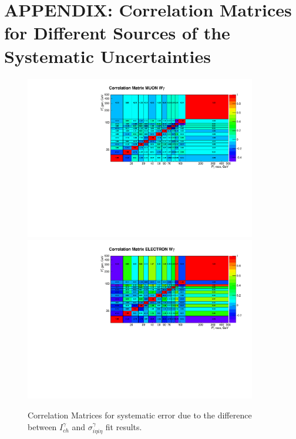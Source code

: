 \section{APPENDIX: Correlation Matrices for Different Sources of the Systematic Uncertainties}
\label{sec:corrMatrices}

\begin{figure}[htb]
  \begin{center}
   \includegraphics[width=0.90\textwidth]{../figs/figs_v11/MUON_WGamma/Constants/matrCorrelation_syst_CHISOvsSIHIH.pdf}\\
\includegraphics[width=0.90\textwidth]{../figs/figs_v11/ELECTRON_WGamma/Constants/matrCorrelation_syst_CHISOvsSIHIH.pdf}
  \caption{Correlation Matrices for systematic error due to the difference between $I_{ch}^{\gamma}$ and $\sigma_{i\eta i\eta}^{\gamma}$ fit results.}
  \label{fig:corrMatrices_syst_CHISOvsSIHIH_Wg}
  \end{center}
\end{figure}

